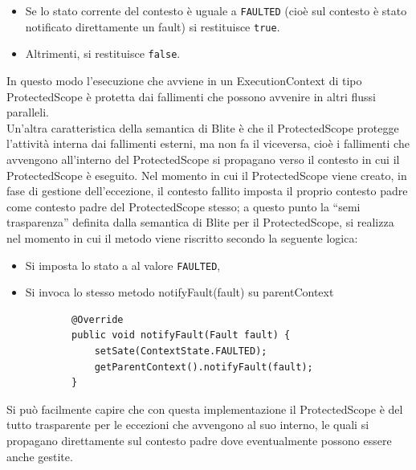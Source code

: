 \begin{itemize}
  \item Se lo stato corrente del contesto \`e uguale a \texttt{FAULTED} (cioè
  sul contesto \`e stato notificato direttamente un fault) si restituisce
  \texttt{true}.  
  \item Altrimenti, si restituisce \texttt{false}.
\end{itemize}

In questo modo l'esecuzione che avviene in un ExecutionContext di tipo
ProtectedScope \`e protetta dai fallimenti che possono avvenire in altri flussi
paralleli. 
\\

Un'altra caratteristica della semantica di Blite \`e che il ProtectedScope
protegge l'attività interna dai fallimenti esterni, ma non fa il viceversa, cioè i
fallimenti che avvengono all'interno del ProtectedScope si propagano verso il
contesto in cui il ProtectedScope \`e eseguito. Nel momento in cui il
ProtectedScope viene creato, in fase di gestione dell'eccezione, il contesto
fallito imposta il proprio contesto padre come contesto padre del ProtectedScope
stesso; a questo punto la ``semi trasparenza'' definita dalla semantica di Blite
per il ProtectedScope, si realizza nel momento in cui il metodo
 viene riscritto secondo la seguente logica:

\begin{itemize}
  \item Si imposta lo stato a al valore \texttt{FAULTED},
  \item Si invoca lo stesso metodo notifyFault(fault) su parentContext
	\begin{lstlisting}
		@Override
   		public void notifyFault(Fault fault) {
        	setSate(ContextState.FAULTED);
        	getParentContext().notifyFault(fault);
    	}
  	\end{lstlisting}   
\end{itemize}

Si può facilmente capire che con questa implementazione il ProtectedScope è del
tutto trasparente per le eccezioni che avvengono al suo interno, le quali si
propagano direttamente sul contesto padre dove eventualmente possono essere
anche gestite.
